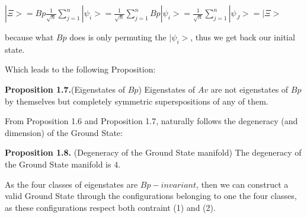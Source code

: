 \documentclass[12pt]{report}
\begin{document}
\begin{minipage}{1 \textwidth}
		\begin{center}
			$|\Xi>= Bp \frac{1}{\sqrt{n}} \sum_{j=1}^{n} |\psi_i> = \frac{1}{\sqrt{n}} \sum_{j=1}^{n} Bp |\psi_i> = \frac{1}{\sqrt{n}} \sum_{j=1}^{n} |\psi_J> =|\Xi>$
		\end{center}
		
		because what $Bp$ does is only permuting the $|\psi_i>$, thus we get back our initial state. \newline
		
		Which leads to the following Proposition:\newline
		
		\textbf{Proposition 1.7.}(Eigenstates of $Bp$) Eigenstates of $Av$ are not eigenstates of $Bp$ by themselves but completely symmetric superspositions of any of them.\newline
		
		From Proposition 1.6 and Proposition 1.7, naturally follows the degeneracy (and dimension) of the Ground State:\newline

		\textbf{Proposition 1.8.} (Degeneracy of the Ground State manifold) The degeneracy of the Ground State manifold is $4$. \newline
		
		As the four classes of eigenstates are $Bp-invariant$, then we can construct a valid Ground State through the configurations belonging to one the four classes, as these configurations respect both contraint (1) and (2).\newline
		
	\end{minipage}
	
\end{document}
